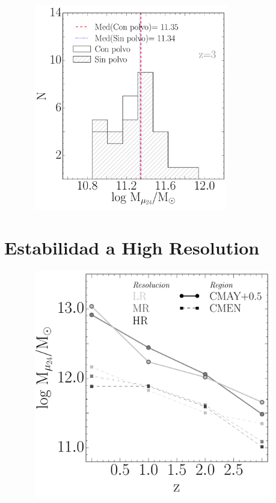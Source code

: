 \begin{figure}[H]
 \centering
 \includegraphics[height=9cm, width=9cm]{../al_final/LR/evolucion/histogramas/Mmu_polvo_vs_nopolvo.pdf}
\end{figure}


\section{Estabilidad a High Resolution}
\begin{figure}[H]
 \centering
 \includegraphics[height=10cm, width=11cm]{../al_final/LR/evolucion/MRvsLR/mr_vs_lr.pdf}
\end{figure}

